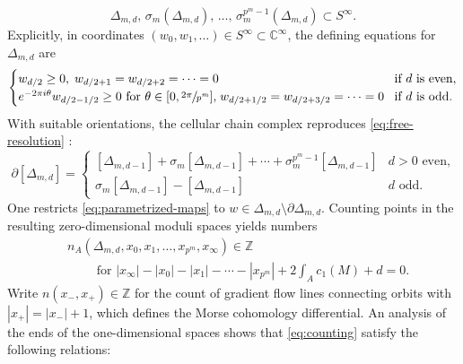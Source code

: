 \documentclass[JEP,XML,SOM,Unicode,NoFloatCountersInSection,published]{cedram}
\theoremstyle{plain}
\theoremstyle{definition}
\newcommand{\bC}{{\mathbb C}}
\newcommand{\bZ}{{\mathbb Z}}
\begin{document}
\begin{equation*}
\Delta_{m,d},\, \sigma_m(\Delta_{m,d}),\, \dots,\, \sigma_m^{p^m-1}(\Delta_{m,d}) \subset S^\infty.
\end{equation*}
Explicitly, in coordinates $(w_0,w_1,\dots) \in S^\infty \subset \bC^\infty$, the defining equations for $\Delta_{m,d}$ are
\begin{equation*}
\label{eq:cells-2}
\begin{cases}
w_{d/2} \geq 0, \; w_{d/2+1} = w_{d/2+2} = \cdots = 0 & \!\text{if $d$ is even}, \\
e^{-2\pi i \theta} w_{d/2-1/2} \geq 0 \text{ for $\theta \in [0,\sfrac{2\pi}{p^m}]$,} \;
w_{d/2+1/2} = w_{d/2+3/2} = \cdots = 0 & \!\text{if $d$ is odd.}
\end{cases}
\end{equation*}
With suitable orientations, the cellular chain complex reproduces \eqref{eq:free-resolution} \cite[Eqs.\,(2.7), (2.8)]{seidel-wilkins21}:
\begin{equation}\label{eq:cellular-differential}
\partial [\Delta_{m,d}] =
\begin{cases}
[\Delta_{m,d-1}] + \sigma_m[\Delta_{m,d-1}] + \cdots + \sigma_m^{p^m-1}[\Delta_{m,d-1}]
& \text{$d>0$ even,} \\
\sigma_m[\Delta_{m,d-1}] - [\Delta_{m,d-1}]
& \text{$d$ odd.}
\end{cases}
\end{equation}
One restricts \eqref{eq:parametrized-maps} to $w \in \Delta_{m,d} \setminus \partial \Delta_{m,d}$. Counting points in the resulting zero-dimensional moduli spaces yields numbers
\begin{equation}\label{eq:counting}
\begin{aligned}
& n_A(\Delta_{m,d},x_0,x_1,\dots,x_{p^m},x_\infty) \in \bZ
\\ & \qquad \text{ for } |x_\infty|-|x_0|-|x_1|-\cdots-|x_{p^m}| + 2\textstyle\int_A c_1(M) + d = 0.
\end{aligned}
\end{equation}
Write $n(x_-,x_+) \in \bZ$ for the count of gradient flow lines connecting orbits with $|x_+| =|x_-| + 1$, which defines the Morse cohomology differential. An analysis of the ends of the one-dimensional spaces \cite[Lem.\,4.1]{seidel-wilkins21} shows that \eqref{eq:counting} satisfy the following relations:
\end{document}

